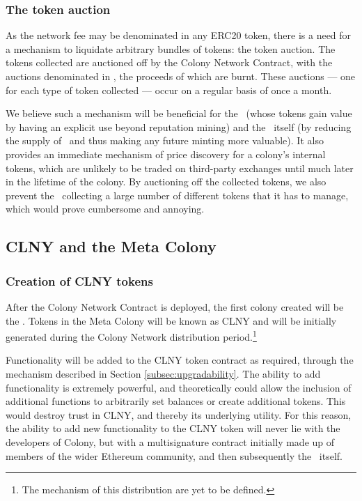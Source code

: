 \subsubsection{The token auction}

As the network fee may be denominated in any ERC20 token, there is a need for a mechanism to liquidate arbitrary bundles of tokens: the token auction. The tokens collected are auctioned off by the Colony Network Contract, with the auctions denominated in \rcts, the proceeds of which are burnt. These auctions --- one for each type of token collected --- occur on a regular basis of once a month.

We believe such a mechanism will be beneficial for the \rcths\ (whose tokens gain value by having an explicit use beyond reputation mining) and the \rc\ itself (by reducing the supply of \rcts\ and thus making any future minting more valuable). It also provides an immediate mechanism of price discovery for a colony's internal tokens, which are unlikely to be traded on third-party exchanges until much later in the lifetime of the colony. By auctioning off the collected tokens, we also prevent the \rc\ collecting a large number of different tokens that it has to manage, which would prove cumbersome and annoying.

\subsection{CLNY and the Meta Colony}\label{sec:clny}

\subsubsection{Creation of CLNY tokens}

After the Colony Network Contract is deployed, the first colony created will be the \rc. Tokens in the Meta Colony will be known as CLNY and will be initially generated during the Colony Network distribution period.\footnote{The mechanism of this distribution are yet to be defined.}

Functionality will be added to the CLNY token contract as required, through the  mechanism described in Section  \ref{subsec:upgradability}. The ability to add functionality is extremely powerful, and theoretically could allow the inclusion of additional functions to arbitrarily set balances or create additional tokens. This would destroy trust in CLNY, and thereby its underlying utility. For this reason, the ability to add new functionality to the CLNY token will never lie with the developers of Colony, but with a multisignature contract initially made up of members of the wider Ethereum community, and then subsequently the \rc\ itself.

